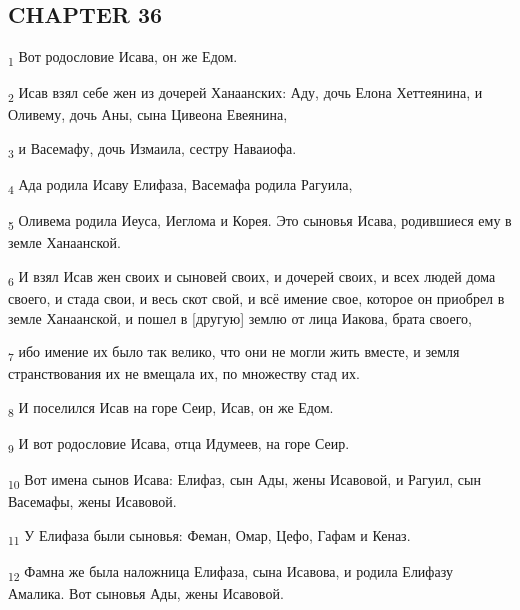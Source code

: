 \subsection{CHAPTER 36}
\begin{tcolorbox}
\textsubscript{1} Вот родословие Исава, он же Едом.
\end{tcolorbox}
\begin{tcolorbox}
\textsubscript{2} Исав взял себе жен из дочерей Ханаанских: Аду, дочь Елона Хеттеянина, и Оливему, дочь Аны, сына Цивеона Евеянина,
\end{tcolorbox}
\begin{tcolorbox}
\textsubscript{3} и Васемафу, дочь Измаила, сестру Наваиофа.
\end{tcolorbox}
\begin{tcolorbox}
\textsubscript{4} Ада родила Исаву Елифаза, Васемафа родила Рагуила,
\end{tcolorbox}
\begin{tcolorbox}
\textsubscript{5} Оливема родила Иеуса, Иеглома и Корея. Это сыновья Исава, родившиеся ему в земле Ханаанской.
\end{tcolorbox}
\begin{tcolorbox}
\textsubscript{6} И взял Исав жен своих и сыновей своих, и дочерей своих, и всех людей дома своего, и стада свои, и весь скот свой, и всё имение свое, которое он приобрел в земле Ханаанской, и пошел в [другую] землю от лица Иакова, брата своего,
\end{tcolorbox}
\begin{tcolorbox}
\textsubscript{7} ибо имение их было так велико, что они не могли жить вместе, и земля странствования их не вмещала их, по множеству стад их.
\end{tcolorbox}
\begin{tcolorbox}
\textsubscript{8} И поселился Исав на горе Сеир, Исав, он же Едом.
\end{tcolorbox}
\begin{tcolorbox}
\textsubscript{9} И вот родословие Исава, отца Идумеев, на горе Сеир.
\end{tcolorbox}
\begin{tcolorbox}
\textsubscript{10} Вот имена сынов Исава: Елифаз, сын Ады, жены Исавовой, и Рагуил, сын Васемафы, жены Исавовой.
\end{tcolorbox}
\begin{tcolorbox}
\textsubscript{11} У Елифаза были сыновья: Феман, Омар, Цефо, Гафам и Кеназ.
\end{tcolorbox}
\begin{tcolorbox}
\textsubscript{12} Фамна же была наложница Елифаза, сына Исавова, и родила Елифазу Амалика. Вот сыновья Ады, жены Исавовой.
\end{tcolorbox}
